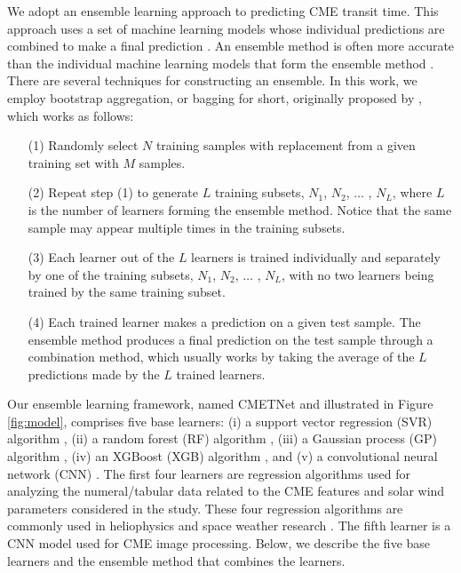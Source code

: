 \documentclass{article}
\begin{document}
We adopt an ensemble learning approach to
predicting CME transit time.
This approach uses a set of machine learning models
 whose individual predictions are combined to make a final prediction \citep{DBLP:conf/mcs/Dietterich00}. 
An ensemble method is often more accurate than the individual
machine learning models that form 
the ensemble method \citep{DBLP:conf/mcs/Dietterich00}. 
There are several techniques for constructing an ensemble. 
In this work, we employ bootstrap aggregation, or bagging for short, 
originally proposed by 
\citet{DBLP:journals/ml/Breiman96b},
which works as follows:

\begin{enumerate}
\item[(1)]
Randomly select $N$ training samples with replacement
from a given training set with $M$ samples.
\item[(2)]
Repeat step (1) to generate $L$ training subsets,
$N_{1}$, $N_{2}$, $\ldots$ , $N_{L}$, 
where $L$ is the number of learners forming the ensemble method. 
Notice that the same sample may appear multiple times in the training subsets.
\item[(3)]
Each learner out of the $L$ learners is trained individually
and separately by one of the training subsets, 
$N_{1}$, $N_{2}$, $\ldots$ , $N_{L}$,
with no two learners being trained by the same training subset. 
\item[(4)]
Each trained learner makes a prediction on a given test sample.
The ensemble method produces a final prediction on the test sample through a combination method,
which usually works by taking the average of the $L$ predictions made 
by the $L$ trained learners.
\end{enumerate}

Our ensemble learning framework, named
CMETNet and illustrated in Figure \ref{fig:model},
comprises five base learners:
(i) a support vector regression (SVR) algorithm \citep{cortes1995support},
(ii) a random forest (RF) algorithm \citep{2001MachL..45....5B},
(iii) a Gaussian process (GP) algorithm \citep{YUAN200847},
(iv) an XGBoost (XGB) algorithm \citep{DBLP:conf/kdd/ChenG16}, and
(v) a convolutional neural network (CNN) \citep{DBLP:conf/shape/CunHBB99}.
The first four learners are regression algorithms used for analyzing
the numeral/tabular data related to the CME features and solar wind parameters considered in the study. These four regression algorithms are commonly used in heliophysics and space weather research \citep{2017ApJ...843..104L,2018SpWea..16.1882G,2018ApJ...861..128I,2021ApJS..257...38T,2022ApJS..260...16A}. The fifth learner is a CNN model used for CME image processing.
Below, we describe the five base learners 
and the ensemble method that combines the learners.
\end{document}
